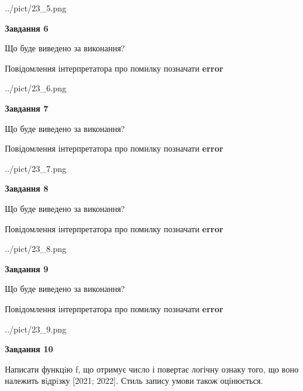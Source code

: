 \documentclass[12pt, ukrainian]{article}
\begin{document}
{\begin {large}
\begin{center}
	{../pict/23_5.png}
\end{center}
\newpage

{\begin {center}\textbf{Завдання 6}\end {center}}\par
Що буде виведено за виконання? \par
Повідомлення інтерпретатора про помилку позначати \textbf{error}

\begin{center}
	{../pict/23_6.png}
\end{center}
\newpage

{\begin {center}\textbf{Завдання 7}\end {center}}\par
Що буде виведено за виконання? \par
Повідомлення інтерпретатора про помилку позначати \textbf{error}

\begin{center}
	{../pict/23_7.png}
\end{center}
\newpage

{\begin {center}\textbf{Завдання 8}\end {center}}\par
Що буде виведено за виконання? \par
Повідомлення інтерпретатора про помилку позначати \textbf{error}

\begin{center}
	{../pict/23_8.png}
\end{center}
\newpage

{\begin {center}\textbf{Завдання 9}\end {center}}\par
Що буде виведено за виконання? \par
Повідомлення інтерпретатора про помилку позначати \textbf{error}

\begin{center}
	{../pict/23_9.png}
\end{center}
\newpage

{\begin {center}\textbf{Завдання 10}\end {center}}\par

Написати функцiю f, що отримує число і повертає логічну ознаку того, що воно належить вiдрiзку [2021; 2022]. Стиль запису умови також оцінюється.\par
\newpage

\end {large}}
\end{document}
